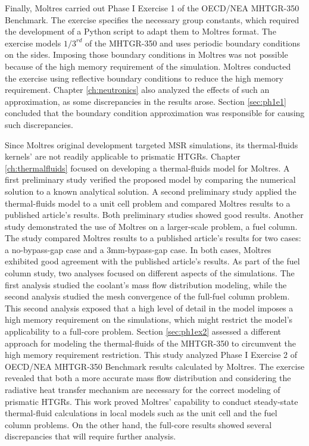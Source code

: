 Finally, Moltres carried out Phase I Exercise 1 of the OECD/NEA MHTGR-350 Benchmark.
The exercise specifies the necessary group constants, which required the development of a Python script to adapt them to Moltres format.
The exercise models $1/3^{rd}$ of the MHTGR-350 and uses periodic boundary conditions on the sides.
Imposing those boundary conditions in Moltres was not possible because of the high memory requirement of the simulation.
Moltres conducted the exercise using reflective boundary conditions to reduce the high memory requirement.
Chapter \ref{ch:neutronics} also analyzed the effects of such an approximation, as some discrepancies in the results arose.
Section \ref{sec:ph1e1} concluded that the boundary condition approximation was responsible for causing such discrepancies.

Since Moltres original development targeted MSR simulations, its thermal-fluids kernels' are not readily applicable to prismatic HTGRs.
Chapter \ref{ch:thermalfluids} focused on developing a thermal-fluids model for Moltres.
A first preliminary study verified the proposed model by comparing the numerical solution to a known analytical solution.
A second preliminary study applied the thermal-fluids model to a unit cell problem and compared Moltres results to a published article's results.
Both preliminary studies showed good results.
Another study demonstrated the use of Moltres on a larger-scale problem, a fuel column.
The study compared Moltres results to a published article's results for two cases: a no-bypass-gap case and a 3mm-bypass-gap case.
In both cases, Moltres exhibited good agreement with the published article's results.
As part of the fuel column study, two analyses focused on different aspects of the simulations.
The first analysis studied the coolant's mass flow distribution modeling, while the second analysis studied the mesh convergence of the full-fuel column problem.
This second analysis exposed that a high level of detail in the model imposes a high memory requirement on the simulations, which might restrict the model's applicability to a full-core problem.
Section \ref{sec:ph1ex2} assessed a different approach for modeling the thermal-fluids of the MHTGR-350 to circumvent the high memory requirement restriction.
This study analyzed Phase I Exercise 2 of OECD/NEA MHTGR-350 Benchmark results calculated by Moltres.
The exercise revealed that both a more accurate mass flow distribution and considering the radiative heat transfer mechanism are necessary for the correct modeling of prismatic HTGRs.
This work proved Moltres' capability to conduct steady-state thermal-fluid calculations in local models such as the unit cell and the fuel column problems.
On the other hand, the full-core results showed several discrepancies that will require further analysis.

